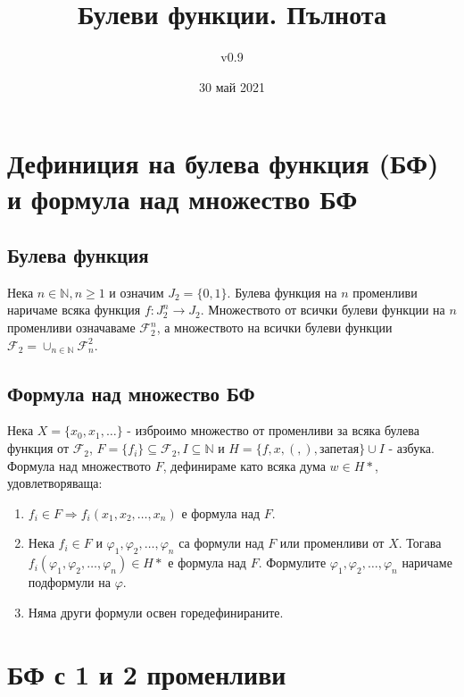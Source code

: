 \documentclass[fleqn,12pt]{article}
\title{Булеви функции. Пълнота}
\author{v0.9}
\date{30 май 2021}
\begin{document}
\maketitle

\tableofcontents

\begin{flushleft}

\section{Дефиниция на булева функция (БФ) и формула над множество БФ}

\subsection{Булева функция}
Нека $n \in \mathbb{N}, n \geq 1$ и означим $J_2 = \{ 0, 1 \}$. 
Булева функция на $n$ променливи наричаме всяка функция $f : J_2^n \rightarrow J_2$.
Множеството от всички булеви функции на $n$ променливи означаваме
$\mathcal{F}_2^n$, а множеството на всички булеви функции $\mathcal{F}_2 = \cup_{n \in \mathbb{N}} \mathcal{F}^2_n$.

\subsection{Формула над множество БФ}
Нека $X = \{ x_0, x_1, \dots \}$ - изброимо множество от променливи за
всяка булева функция от $\mathcal{F}_2$, $F = \{ f_i \} \subseteq \mathcal{F}_2, I \subseteq \mathbb{N}$
и $H = \{ f, x, (, ), \text{запетая}  \} \cup I $ - азбука.
Формула над множеството $F$, дефинираме като всяка дума $w \in H*$, удовлетворяваща:
\begin{enumerate}
    \item $f_i \in F \Rightarrow f_i(x_1,x_2,\dots,x_n)$ е формула над $F$.
    \item \label{formulas:superposition} Нека $f_i \in F$ и $\varphi_1, \varphi_2, \dots, \varphi_n$ са формули над $F$ или променливи от $X$.
    Тогава $f_i(\varphi_1, \varphi_2, \dots, \varphi_n) \in H*$ е формула над $F$. Формулите $\varphi_1, \varphi_2, \dots, \varphi_n$ наричаме подформули на $\varphi$.
    \item Няма други формули освен горедефинираните.
\end{enumerate}

\section{БФ с 1 и 2 променливи}


\end{flushleft}
\end{document}
